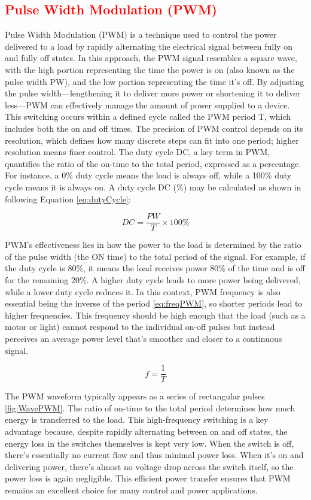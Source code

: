 \subsection{\textcolor{red}{Pulse Width Modulation (PWM)}}
Pulse Width Modulation (PWM) is a technique used to control the power delivered to a load by rapidly alternating the electrical signal between fully on and fully off states. In this approach, the PWM signal resembles a square wave, with the high portion representing the time the power is on (also known as the pulse width PW), and the low portion representing the time it’s off. By adjusting the pulse width—lengthening it to deliver more power or shortening it to deliver less—PWM can effectively manage the amount of power supplied to a device. This switching occurs within a defined cycle called the PWM period T, which includes both the on and off times. The precision of PWM control depends on its resolution, which defines how many discrete steps can fit into one period; higher resolution means finer control. The duty cycle DC, a key term in PWM, quantifies the ratio of the on-time to the total period, expressed as a percentage. For instance, a 0\% duty cycle means the load is always off, while a 100\% duty cycle means it is always on. A duty cycle DC (\%) may be calculated as shown in following Equation \ref{eq:dutyCycle}:

\begin{equation}
	DC = \frac{PW}{T} \times 100\% 
\label{eq:dutyCycle}
\end{equation} 

PWM’s effectiveness lies in how the power to the load is determined by the ratio of the pulse width (the ON time) to the total period of the signal. For example, if the duty cycle is 80\%, it means the load receives power 80\% of the time and is off for the remaining 20\%. A higher duty cycle leads to more power being delivered, while a lower duty cycle reduces it. In this context, PWM frequency is also essential being the inverse of the period \ref{eq:freqPWM}, so shorter periods lead to higher frequencies. This frequency should be high enough that the load (such as a motor or light) cannot respond to the individual on-off pulses but instead perceives an average power level that’s smoother and closer to a continuous signal.

\begin{equation}
	f = \frac{1}{T}
	\label{eq:freqPWM}
\end{equation} 

The PWM waveform typically appears as a series of rectangular pulses \ref{fig:WavePWM}. The ratio of on-time to the total period determines how much energy is transferred to the load. This high-frequency switching is a key advantage because, despite rapidly alternating between on and off states, the energy loss in the switches themselves is kept very low. When the switch is off, there’s essentially no current flow and thus minimal power loss. When it’s on and delivering power, there’s almost no voltage drop across the switch itself, so the power loss is again negligible. This efficient power transfer ensures that PWM remains an excellent choice for many control and power applications.

